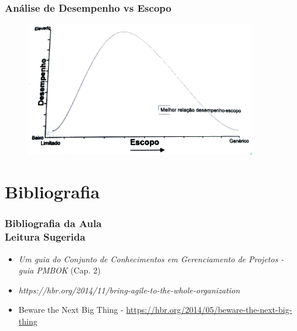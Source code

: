 \begin{frame}
 \frametitle{Análise de Desempenho vs Escopo}
   \begin{figure}
 \includegraphics[width = 0.9\textwidth]{figs/fig18.png}
\end{figure}
\end{frame}
\section{Bibliografia}

\begin{frame}
 \frametitle{Bibliografia da Aula \\ 
 Leitura Sugerida}
 \begin{itemize}
  \item \textit{Um guia do Conjunto de Conhecimentos em Gerenciamento de Projetos - guia PMBOK} (Cap. 2)
  \item \textit{https://hbr.org/2014/11/bring-agile-to-the-whole-organization} 
  \item Beware the Next Big Thing - \url{https://hbr.org/2014/05/beware-the-next-big-thing}
 \end{itemize}

\end{frame}

